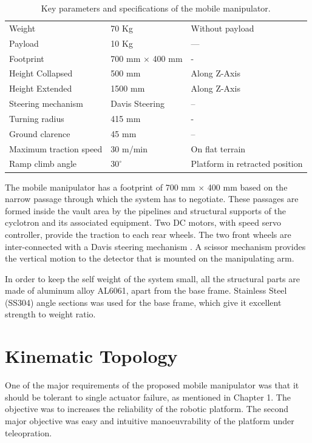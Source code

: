 %
\begin{table}[!htbp]
	\caption{Key parameters and specifications of the mobile manipulator.}
	\label{tb:specifications}
	\centering
	\begin{tabular}{l l l}
		\hline
		
		Weight  & 70 Kg & Without payload \\ 
		Payload & 10 Kg &---\\
		Footprint & 700 mm $\times$  400 mm & - \\
		Height Collapsed & 500 mm  & Along  Z-Axis\\
		Height Extended & 1500 mm & Along  Z-Axis  \\
		Steering mechanism & Davis Steering & --\\
		Turning radius & 415 mm & - \\
		Ground clarence & 45 mm & --\\
		Maximum traction speed & 30 m/min & On flat terrain \\
		Ramp climb angle & $30^\circ $ & Platform in retracted position\\
		\hline
	\end{tabular}
\end{table}

The mobile manipulator has a footprint of 700 mm $\times$  400 mm  based on the narrow passage through which the system  has to negotiate. These passages are formed inside the vault area by the pipelines and  structural supports of the cyclotron and its associated equipment.  Two DC motors, with speed servo controller,  provide the traction to each rear wheels. The two front wheels are  inter-connected with a Davis steering mechanism \cite{TOMBook}. A scissor mechanism provides the vertical  motion to the detector that is mounted on the manipulating arm.

 In order to keep the self weight of the system small, all the  structural parts are made of aluminum alloy AL6061, apart from the base frame. Stainless Steel (SS304)  angle sections was used for the base frame, which give it  excellent strength to weight ratio. 
 
 \section{Kinematic Topology}
 \label{sec:KineTopo}
 One of the major requirements of the proposed mobile manipulator was that it should be tolerant to single actuator failure, as mentioned in  Chapter 1. The objective was to increases the reliability of the robotic platform. The second major objective was easy and intuitive manoeuvrability  of the platform under teleopration.
 
